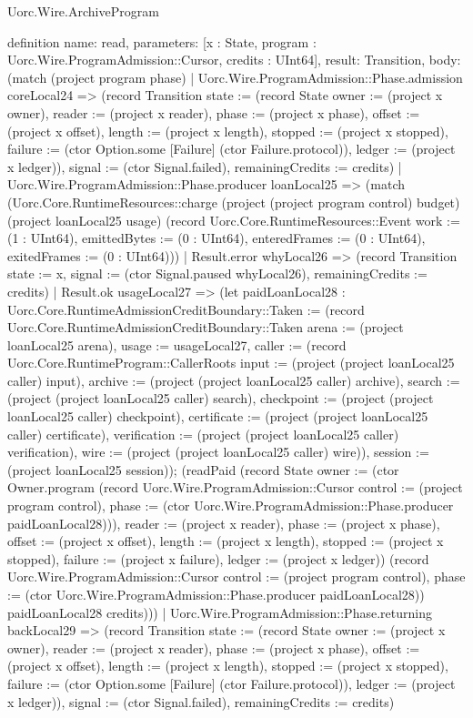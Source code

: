 \begin{lexlean}{Uorc.Wire.ArchiveProgram}
\begin{semanticmodule}
definition{
  name: read,
  parameters: [x : State, program : Uorc.Wire.ProgramAdmission::Cursor, credits : UInt64],
  result: Transition,
  body: (match (project program phase)
    | Uorc.Wire.ProgramAdmission::Phase.admission coreLocal24 => (record Transition {state := (record State {owner := (project x owner), reader := (project x reader), phase := (project x phase), offset := (project x offset), length := (project x length), stopped := (project x stopped), failure := (ctor Option.some [Failure] (ctor Failure.protocol)), ledger := (project x ledger)}), signal := (ctor Signal.failed), remainingCredits := credits})
    | Uorc.Wire.ProgramAdmission::Phase.producer loanLocal25 => (match (Uorc.Core.RuntimeResources::charge (project (project program control) budget) (project loanLocal25 usage) (record Uorc.Core.RuntimeResources::Event {work := (1 : UInt64), emittedBytes := (0 : UInt64), enteredFrames := (0 : UInt64), exitedFrames := (0 : UInt64)}))
      | Result.error whyLocal26 => (record Transition {state := x, signal := (ctor Signal.paused whyLocal26), remainingCredits := credits})
      | Result.ok usageLocal27 => (let paidLoanLocal28 : Uorc.Core.RuntimeAdmissionCreditBoundary::Taken := (record Uorc.Core.RuntimeAdmissionCreditBoundary::Taken {arena := (project loanLocal25 arena), usage := usageLocal27, caller := (record Uorc.Core.RuntimeProgram::CallerRoots {input := (project (project loanLocal25 caller) input), archive := (project (project loanLocal25 caller) archive), search := (project (project loanLocal25 caller) search), checkpoint := (project (project loanLocal25 caller) checkpoint), certificate := (project (project loanLocal25 caller) certificate), verification := (project (project loanLocal25 caller) verification), wire := (project (project loanLocal25 caller) wire)}), session := (project loanLocal25 session)}); (readPaid (record State {owner := (ctor Owner.program (record Uorc.Wire.ProgramAdmission::Cursor {control := (project program control), phase := (ctor Uorc.Wire.ProgramAdmission::Phase.producer paidLoanLocal28)})), reader := (project x reader), phase := (project x phase), offset := (project x offset), length := (project x length), stopped := (project x stopped), failure := (project x failure), ledger := (project x ledger)}) (record Uorc.Wire.ProgramAdmission::Cursor {control := (project program control), phase := (ctor Uorc.Wire.ProgramAdmission::Phase.producer paidLoanLocal28)}) paidLoanLocal28 credits)))
    | Uorc.Wire.ProgramAdmission::Phase.returning backLocal29 => (record Transition {state := (record State {owner := (project x owner), reader := (project x reader), phase := (project x phase), offset := (project x offset), length := (project x length), stopped := (project x stopped), failure := (ctor Option.some [Failure] (ctor Failure.protocol)), ledger := (project x ledger)}), signal := (ctor Signal.failed), remainingCredits := credits})
}
\end{semanticmodule}
\end{lexlean}

